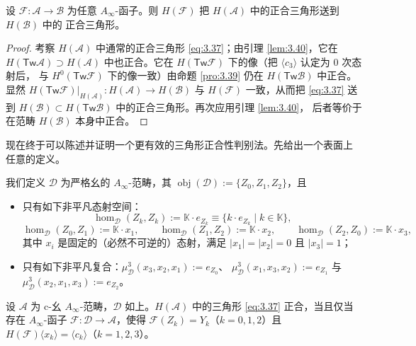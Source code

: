 \begin{Cor}\label{cor:3.41}
设 $\mathcal F:\mathcal A\to\mathcal B$ 为任意 $A_\infty$-函子。则
$H(\mathcal F)$ 把 $H(\mathcal A)$ 中的正合三角形送到 $H(\mathcal B)$ 中的
正合三角形。
\end{Cor}

\begin{proof}
考察 $H(\mathcal A)$ 中通常的正合三角形 \eqref{eq:3.37}；由引理 \ref{lem:3.40}，它在
$H(\mathsf{Tw}\mathcal A)\supset H(\mathcal A)$ 中也正合。它在
$H(\mathsf{Tw}\mathcal F)$ 下的像（把 $\langle c_3\rangle$ 认定为 0 次态射后，
与 $H^0(\mathsf{Tw}\mathcal F)$ 下的像一致）由命题 \ref{pro:3.39} 仍在
$H(\mathsf{Tw}\mathcal B)$ 中正合。显然
$H(\mathsf{Tw}\mathcal F)|_{H(\mathcal A)}:H(\mathcal A)\to H(\mathcal B)$
与 $H(\mathcal F)$ 一致，从而把 \eqref{eq:3.37} 送到 $H(\mathcal B)\subset
H(\mathsf{Tw}\mathcal B)$ 中的正合三角形。再次应用引理 \ref{lem:3.40}，
后者等价于在范畴 $H(\mathcal B)$ 本身中正合。
\end{proof}

现在终于可以陈述并证明一个更有效的三角形正合性判别法。先给出一个表面上
任意的定义。

\begin{Def}\label{def:3.42}
我们定义 $\mathcal D$ 为严格幺的 $A_\infty$-范畴，其
$\operatorname{obj}(\mathcal D):=\{Z_0,Z_1,Z_2\}$，且
\begin{itemize}
  \item 只有如下非平凡态射空间：
        \[
          \hom_{\mathcal D}(Z_k,Z_k):=\mathbb K\cdot e_{Z_k}\equiv
          \{k\cdot e_{Z_k}\mid k\in\mathbb K\},
        \]
        \[
          \hom_{\mathcal D}(Z_0,Z_1):=\mathbb K\cdot x_1,\qquad
          \hom_{\mathcal D}(Z_1,Z_2):=\mathbb K\cdot x_2,\qquad
          \hom_{\mathcal D}(Z_2,Z_0):=\mathbb K\cdot x_3,
        \]
        其中 $x_i$ 是固定的（必然不可逆的）态射，满足
        $|x_1|=|x_2|=0$ 且 $|x_3|=1$；
  \item 只有如下非平凡复合：$\mu^3_{\mathcal D}(x_3,x_2,x_1):=e_{Z_0}$、
        $\mu^3_{\mathcal D}(x_1,x_3,x_2):=e_{Z_1}$ 与
        $\mu^3_{\mathcal D}(x_2,x_1,x_3):=e_{Z_2}$。
\end{itemize}
\end{Def}

\begin{Pro}\label{pro:3.43}
设 $\mathcal A$ 为 c-幺 $A_\infty$-范畴，$\mathcal D$ 如上。$H(\mathcal A)$
中的三角形 \eqref{eq:3.37} 正合，当且仅当存在 $A_\infty$-函子
$\mathcal F:\mathcal D\to\mathcal A$，使得
$\mathcal F(Z_k)=Y_k$（$k=0,1,2$）且 $H(\mathcal F)\langle x_k\rangle=
\langle c_k\rangle$（$k=1,2,3$）。
\end{Pro}


